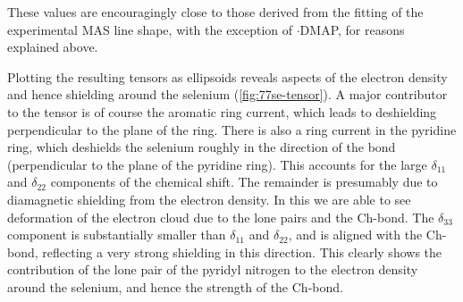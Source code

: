 \begin{refsection}
These values are encouragingly close to those derived from the fitting of the experimental MAS line shape, with the exception of $ \cdot $DMAP, for reasons explained above.

Plotting the resulting tensors as ellipsoids reveals aspects of the electron density and hence shielding around the selenium (\cref{fig:77se-tensor}).
A major contributor to the tensor is of course the aromatic ring current, which leads to deshielding perpendicular to the plane of the ring.
There is also a ring current in the pyridine ring, which deshields the selenium roughly in the direction of the  bond (perpendicular to the plane of the pyridine ring).
This accounts for the large $\delta_{11}$ and $\delta_{22}$ components of the chemical shift.
The remainder is presumably due to diamagnetic shielding from the electron density.
In this we are able to see deformation of the electron cloud due to the lone pairs and the Ch-bond.
The  $\delta_{33}$ component is substantially smaller than $\delta_{11}$ and $\delta_{22}$, and is aligned with the Ch-bond, reflecting a very strong shielding in this direction.
This clearly shows the contribution of the lone pair of the pyridyl nitrogen to the electron density around the selenium, and hence the strength of the Ch-bond.


\end{refsection}
